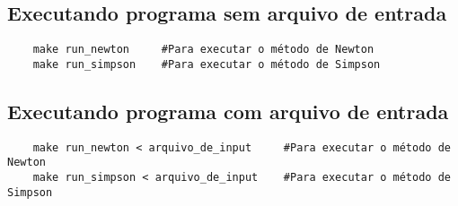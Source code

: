 \subsection*{Executando programa sem arquivo de entrada}
\begin{verbatim}
	make run_newton     #Para executar o método de Newton
	make run_simpson    #Para executar o método de Simpson
\end{verbatim}

\subsection*{Executando programa com arquivo de entrada}
\label{subsec:ex_com}
\begin{verbatim}
	make run_newton < arquivo_de_input     #Para executar o método de Newton
	make run_simpson < arquivo_de_input    #Para executar o método de Simpson
\end{verbatim}

